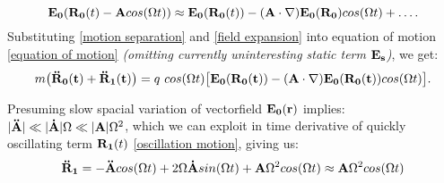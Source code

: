 \begin{equation}
	\label{field expansion}
	\vb{E_0}(\vb{R_0}(t) - \vb{A} cos(\Omega t)) \approx \vb{E_0}(\vb{R_0}(t)) -(\vb{A} \cdot \nabla) \vb{E_0}(\vb{R_0}) cos(\Omega t) + \dots.
\end{equation}
Substituting \eqref{motion separation} and \eqref{field expansion} into equation of motion \eqref{equation of motion} \textit{(omitting currently uninteresting static term $\vb{E_s}$)}, we get:
\begin{equation}
	m \big( \vb{\ddot{R}_0(t)} + \vb{\ddot{R}_1(t)} \big) = q \ cos(\Omega t) \big[ \vb{E_0(\vb{R_0}(t))} - (\vb{A} \cdot \nabla) \vb{E_0(\vb{R_0}(t))} cos(\Omega t)  \big].
\end{equation}

Presuming slow spacial variation of vectorfield $\vb{E_0}(\vb{r})$ implies: \\ $|\vb{\ddot{A}}| \ll |\vb{\dot{A}}| \Omega \ll |\vb{A}| \Omega^2$, which we can exploit in time derivative of quickly oscillating term $\vb{R_1}(t)$ \eqref{oscillation motion}, giving us:
\begin{equation}
	\vb{\ddot{R}_1} = - \vb{\ddot{A}} cos(\Omega t) + 2 \Omega \vb{\dot{A}} sin(\Omega t) + \vb{A} \Omega^2 cos(\Omega t) \approx \vb{A} \Omega^2 cos(\Omega t)
\end{equation}

